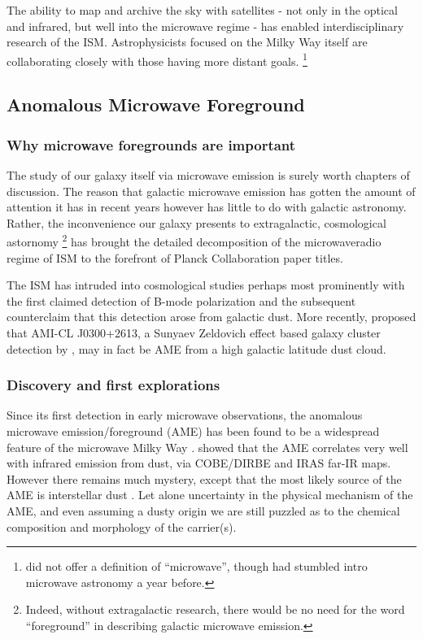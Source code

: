   The ability to map and archive the sky with satellites - not only in the optical and infrared, but well into the microwave regime - has enabled interdisciplinary research of the ISM. Astrophysicists focused on the Milky Way itself are collaborating closely with those having more distant goals. \footnote{\cite{johnson66} did not offer a definition of ``microwave'', though \cite{penzias65} had stumbled intro microwave astronomy a year before. }

\subsection{Anomalous Microwave Foreground}

  \subsubsection{Why microwave foregrounds are important}
    The study of our galaxy itself via microwave emission is surely worth chapters of discussion. The reason that galactic microwave emission has gotten the amount of attention it has in recent years however has little to do with galactic astronomy. Rather, the inconvenience our galaxy presents to extragalactic, cosmological astornomy \footnote{Indeed, without extragalactic research, there would be no need for the word ``foreground'' in describing galactic microwave emission.} has brought the detailed decomposition of the microwave\-radio regime of ISM to the forefront of Planck Collaboration paper titles.

    The ISM has intruded into cosmological studies perhaps most prominently with the first claimed detection of B-mode polarization \citep{hanson13, bicep214, flauger14} and the subsequent counter\-claim that this detection arose from galactic dust. More recently, \cite{perrott18} proposed that AMI-CL J0300+2613, a Sunyaev Zeldovich effect based galaxy cluster detection  by \cite{shimwell12}, may in fact be AME from a high galactic latitude dust cloud.

  \subsubsection{Discovery and first explorations}

     Since its first detection in early microwave observations, the anomalous microwave emission/foreground (AME) has been found to be a widespread feature of the microwave Milky Way \citep{dickinson13r}. \cite{kogut96,deoliveiracosta97,leitch98} showed that the AME correlates very well with infrared emission from dust, via COBE/DIRBE and IRAS far-IR maps. However there remains much mystery, except that the most likely source of the AME is interstellar dust \citep{ysard10a,tibbs11,hensley16}. Let alone uncertainty in the physical mechanism of the AME, and even assuming a dusty origin\- we are still puzzled as to the chemical composition and morphology of the carrier(s).

